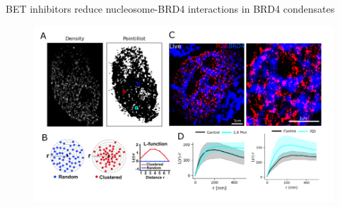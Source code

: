 \documentclass{beamer}					%
\begin{document}
\begin{frame}{BET inhibitors reduce nucleosome-BRD4 interactions in BRD4 condensates}
\begin{figure}
\includegraphics[width=13cm]{BRD4-Results.png}
\end{figure}
\end{frame}

\end{document}
